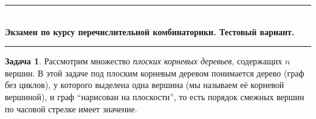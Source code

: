 \documentclass[a5paper]{article}
\def \topic {Экзамен по курсу перечислительной комбинаторики.
Тестовый вариант.}
\theoremstyle{definition}
\newtheorem{problem}{Задача}
\begin{document}
\begin{center}

\newcommand{\HRule}{\rule{\linewidth}{0.5mm}}
\HRule \\[0.2cm]
{ \Large \bfseries \topic} %
\HRule

\end{center}

\begin{minipage}{0.6\textwidth}
\begin{problem}
Рассмотрим множество \emph{плоских корневых деревьев}, содержащих \( n \) вершин. В этой задаче 
под плоским корневым деревом понимается дерево (граф без циклов), у которого
выделена одна вершина (мы называем её корневой вершиной), и граф ``нарисован на
плоскости'', то есть порядок смежных вершин по часовой стрелке имеет значение.
\end{problem}

\end{minipage}%
\hfill%
\begin{minipage}{0.4\textwidth}
\raggedleft
{}
\end{minipage}
\vspace{.05cm}
\end{document}
